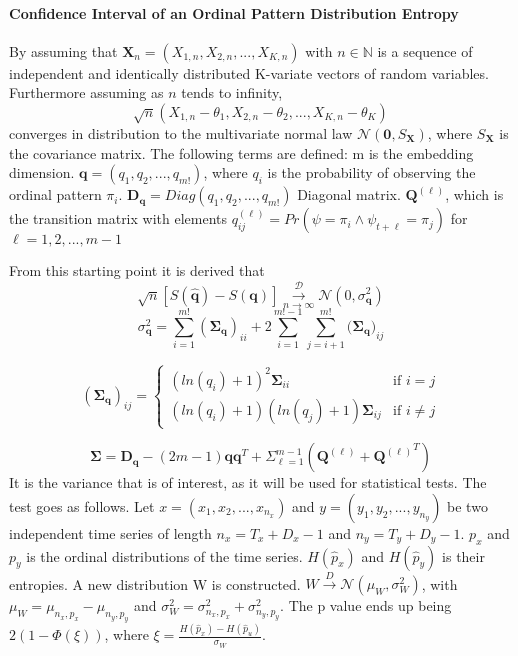 \paragraph{Confidence Interval of an Ordinal Pattern Distribution Entropy}
By assuming that $\textbf{X}_n = (X_{1,n},X_{2,n},...,X_{K,n})$ with $n \in \mathbb{N}$ is a sequence of independent and identically distributed K-variate vectors of random variables. Furthermore assuming as $n$ tends to infinity, $$\sqrt{n}(X_{1,n}-\theta_1,X_{2,n}-\theta_2,...,X_{K,n}-\theta_K)$$ 
converges in distribution to the multivariate normal law $\mathscr{N}(\textbf{0},S_{\textbf{X}})$, where $S_{\textbf{X}}$ is the covariance matrix. The following terms are defined:
m is the embedding dimension.
$\mathbf{q}=(q_1,q_2,...,q_{m!})$, where $q_i$ is the probability of observing the ordinal pattern $\pi_i$.
$\mathbf{D_q}=Diag(q_1,q_2,...,q_{m!})$ Diagonal matrix.
$\mathbf{Q}^{(\ell)}$, which is the transition matrix with elements
$q_{ij}^{(\ell)}=Pr(\psi =\pi_i \wedge \psi_{t+\ell}=\pi_j)$
for $\ell = 1,2,...,m-1$


From this starting point it is derived that 
$$\sqrt{n}[S(\hat{\textbf{q}})-S(\textbf{q})] \overset{\mathscr{D}}{\underset{n\rightarrow\infty}{\longrightarrow}}\mathscr{N}(0,\sigma_{\textbf{q}}^2)$$
$$ \sigma_{\textbf{q}}^2=\sum_{i=1}^{m!}(\mathbf{\Sigma_q})_{ii}+2\sum_{i=1}^{m!-1}\sum_{j=i+1}^{m!}(\bm{\Sigma_q)}_{ij}$$

\begin{displaymath}
  (\mathbf{\Sigma_q})_{ij} = \left\{
    \begin{array}{lr}
      (ln(q_i)+1)^2\mathbf{\Sigma}_{ii} & \text{if $i=j$}\\
      (ln(q_i)+1)(ln(q_j)+1)\mathbf{\Sigma}_{ij} & \text{if $i \neq j$}
    \end{array}
  \right.
\end{displaymath} 

$$\mathbf{\Sigma}=\mathbf{D_q}-(2m-1)\mathbf{qq}^T+\Sigma_{\ell=1}^{m-1}(\mathbf{Q}^{(\ell)}+{\mathbf{Q}^{(\ell)}}^T)$$  
\cite{Rey2023}It is the variance that is of interest, as it will be used for statistical tests. The test goes as follows. Let $x=(x_1,x_2,...,x_{n_x})$ and $y=(y_1,y_2,...,y_{n_y})$ be two independent time series of length $n_x=T_x+D_x-1$ and $n_y=T_y+D_y-1$. $p_x$ and $p_y$ is the ordinal distributions of the time series. $H(\hat{p}_x)$ and $H(\hat{p}_y)$ is their entropies. A new distribution W is constructed. $W \overset{D}{\rightarrow}\mathscr{N}(\mu_W,\sigma_W^2)$, with $\mu_W=\mu_{n_x,p_x}-\mu_{n_y,p_y}$ and $\sigma_W^2=\sigma_{n_x,p_x}^2+\sigma_{n_y,p_y}^2$. 
The p value ends up being $2(1-\Phi(\xi))$, where $\xi = \frac{H(\hat{p}_x)-H(\hat{p}_u)}{\sigma_W}$. \cite{Chagas2022}


